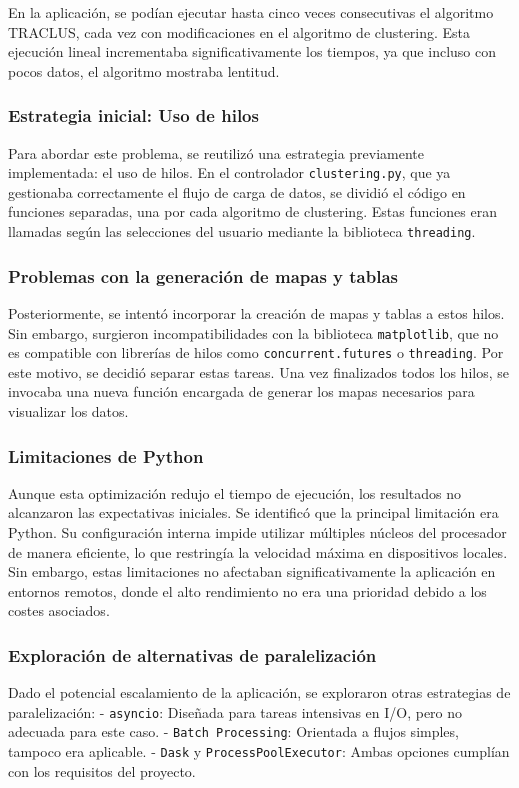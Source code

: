 En la aplicación, se podían ejecutar hasta cinco veces consecutivas el algoritmo TRACLUS, cada vez con modificaciones en el algoritmo de clustering. Esta ejecución lineal incrementaba significativamente los tiempos, ya que incluso con pocos datos, el algoritmo mostraba lentitud.

\subsubsection{Estrategia inicial: Uso de hilos}
Para abordar este problema, se reutilizó una estrategia previamente implementada: el uso de hilos. En el controlador \texttt{clustering.py}, que ya gestionaba correctamente el flujo de carga de datos, se dividió el código en funciones separadas, una por cada algoritmo de clustering. Estas funciones eran llamadas según las selecciones del usuario mediante la biblioteca \texttt{threading}.

\subsubsection{Problemas con la generación de mapas y tablas}
Posteriormente, se intentó incorporar la creación de mapas y tablas a estos hilos. Sin embargo, surgieron incompatibilidades con la biblioteca \texttt{matplotlib}, que no es compatible con librerías de hilos como \texttt{concurrent.futures} o \texttt{threading}. Por este motivo, se decidió separar estas tareas. Una vez finalizados todos los hilos, se invocaba una nueva función encargada de generar los mapas necesarios para visualizar los datos.

\subsubsection{Limitaciones de Python}
Aunque esta optimización redujo el tiempo de ejecución, los resultados no alcanzaron las expectativas iniciales. Se identificó que la principal limitación era Python. Su configuración interna impide utilizar múltiples núcleos del procesador de manera eficiente, lo que restringía la velocidad máxima en dispositivos locales. Sin embargo, estas limitaciones no afectaban significativamente la aplicación en entornos remotos, donde el alto rendimiento no era una prioridad debido a los costes asociados.

\subsubsection{Exploración de alternativas de paralelización}
Dado el potencial escalamiento de la aplicación, se exploraron otras estrategias de paralelización:
- \texttt{asyncio}: Diseñada para tareas intensivas en I/O, pero no adecuada para este caso.
- \texttt{Batch Processing}: Orientada a flujos simples, tampoco era aplicable.
- \texttt{Dask} y \texttt{ProcessPoolExecutor}: Ambas opciones cumplían con los requisitos del proyecto.

